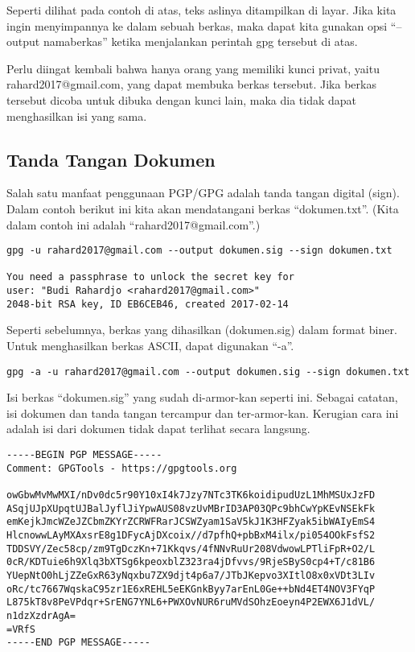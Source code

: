Seperti dilihat pada contoh di atas, teks aslinya ditampilkan di layar. Jika
kita ingin menyimpannya ke dalam sebuah berkas, maka dapat kita gunakan opsi
``--output namaberkas'' ketika menjalankan perintah gpg tersebut di atas.

Perlu diingat kembali bahwa hanya orang yang memiliki kunci privat, yaitu
rahard2017@gmail.com, yang dapat membuka berkas tersebut. Jika berkas tersebut
dicoba untuk dibuka dengan kunci lain, maka dia tidak dapat menghasilkan isi
yang sama.

\subsection{Tanda Tangan Dokumen}
Salah satu manfaat penggunaan PGP/GPG adalah tanda tangan digital (sign). Dalam
contoh berikut ini kita akan mendatangani berkas ``dokumen.txt''. (Kita dalam
contoh ini adalah ``rahard2017@gmail.com''.)

\begin{verbatim}
gpg -u rahard2017@gmail.com --output dokumen.sig --sign dokumen.txt

You need a passphrase to unlock the secret key for
user: "Budi Rahardjo <rahard2017@gmail.com>"
2048-bit RSA key, ID EB6CEB46, created 2017-02-14
\end{verbatim}

Seperti sebelumnya, berkas yang dihasilkan (dokumen.sig) dalam format biner.
Untuk menghasilkan berkas ASCII, dapat digunakan ``-a''.

\begin{verbatim}
gpg -a -u rahard2017@gmail.com --output dokumen.sig --sign dokumen.txt
\end{verbatim}

Isi berkas ``dokumen.sig'' yang sudah di-armor-kan seperti ini. Sebagai
catatan, isi dokumen dan tanda tangan tercampur dan ter-armor-kan. Kerugian
cara ini adalah isi dari dokumen tidak dapat terlihat secara langsung.

\begin{verbatim}
-----BEGIN PGP MESSAGE-----
Comment: GPGTools - https://gpgtools.org

owGbwMvMwMXI/nDv0dc5r90Y10xI4k7Jzy7NTc3TK6koidipudUzL1MhMSUxJzFD
ASqjUJpXUpqtUJBalJyflJiYpwAUS08vzUvMBrID3AP03QPc9bhCwYpKEvNSEkFk
emKejkJmcWZeJZCbmZKYrZCRWFRarJCSWZyam1SaV5kJ1K3HFZyak5ibWAIyEmS4
HlcnowwLAyMXAxsrE8g1DFycAjDXcoix//d7pfhQ+pbBxM4ilx/pi054OOkFsfS2
TDDSVY/Zec58cp/zm9TgDczKn+71Kkqvs/4fNNvRuUr208VdwowLPTliFpR+O2/L
0cR/KDTuie6h9Xlq3bXTSg6kpeoxblZ323ra4jDfvvs/9RjeSByS0cp4+T/c81B6
YUepNtO0hLjZZeGxR63yNqxbu7ZX9djt4p6a7/JTbJKepvo3XItlO8x0xVDt3LIv
oRc/tc7667WqskaC95zr1E6xREHL5eEKGnkByy7arEnL0Ge++bNd4ET4NOV3FYqP
L875kT8v8PeVPdqr+SrENG7YNL6+PWXOvNUR6ruMVdSOhzEoeyn4P2EWX6J1dVL/
n1dzXzdrAgA=
=VRfS
-----END PGP MESSAGE-----
\end{verbatim}


